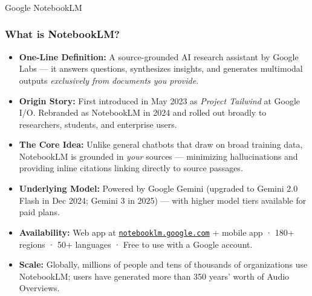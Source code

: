 \begin{frame}[fragile]\frametitle{}

\begin{center}
{\Large Google NotebookLM}
\end{center}
\end{frame}

\begin{frame}[fragile]\frametitle{What is NotebookLM?}
  \begin{itemize}
    \item \textbf{One-Line Definition:} A source-grounded AI research assistant by Google Labs — it answers questions, synthesizes insights, and generates multimodal outputs \textit{exclusively from documents you provide}.
    \item \textbf{Origin Story:} First introduced in May 2023 as \textit{Project Tailwind} at Google I/O. Rebranded as NotebookLM in 2024 and rolled out broadly to researchers, students, and enterprise users.
    \item \textbf{The Core Idea:} Unlike general chatbots that draw on broad training data, NotebookLM is grounded in \textit{your} sources — minimizing hallucinations and providing inline citations linking directly to source passages.
    \item \textbf{Underlying Model:} Powered by Google Gemini (upgraded to Gemini 2.0 Flash in Dec 2024; Gemini 3 in 2025) — with higher model tiers available for paid plans.
    \item \textbf{Availability:} Web app at \href{https://notebooklm.google.com}{\texttt{notebooklm.google.com}} + mobile app · 180+ regions · 50+ languages · Free to use with a Google account.
    \item \textbf{Scale:} Globally, millions of people and tens of thousands of organizations use NotebookLM; users have generated more than 350 years' worth of Audio Overviews.
  \end{itemize}
\end{frame}

